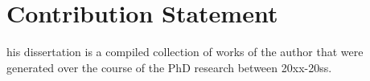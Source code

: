 \chapter*{Contribution Statement}

his dissertation is a compiled collection of works of the author that were generated over the course of the PhD research between 20xx-20ss. \lipsum[2-4]
\clearpage
